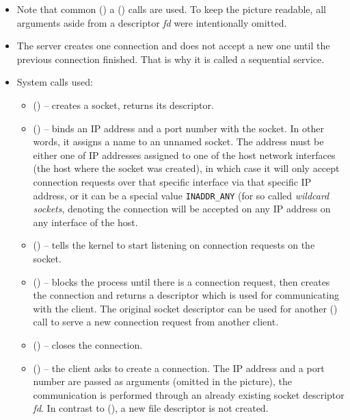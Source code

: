 \begin{itemize}
\item Note that common () a () calls are used.  To
keep the picture readable, all arguments aside from a descriptor \emph{fd} were
intentionally omitted.
\item The server creates one connection and does not accept a new one until the
previous connection finished.  That is why it is called a sequential service.
\item System calls used:
\begin{itemize}
\item {}() -- creates a socket, returns its descriptor.

\item {}() -- binds an IP address and a port number with the socket.
In other words, it assigns a name to an unnamed socket.  The address must be
either one of IP addresses assigned to one of the host network interfaces (the
host where the socket was created), in which case it will only accept connection
requests over that specific interface via that specific IP address, or it can be
a special value \texttt{INADDR\_ANY} (for so called \emph{wildcard sockets},
denoting the connection will be accepted on any IP address on any interface of
the host.
\item {}() -- tells the kernel to start listening on connection
requests on the socket.
\item {}() -- blocks the process until there is a connection
request, then creates the connection and returns a  descriptor which
is used for communicating with the client.  The original socket descriptor can
be used for another () call to serve a new connection request from
another client.
\item {}() -- closes the connection.
\item {}() -- the client asks to create a connection.  The IP
address and a port number are passed as arguments (omitted in the picture), the
communication is performed through an already existing socket descriptor
\emph{fd}.  In contrast to (), a new file descriptor is not
created.
\end{itemize}
\end{itemize}



